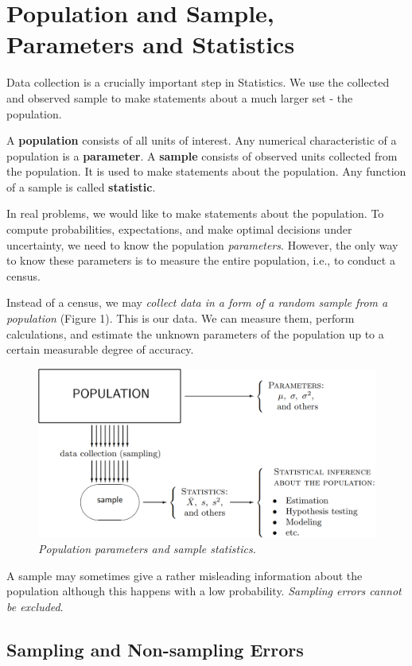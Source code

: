 \section{Population and Sample, Parameters and Statistics}

Data collection is a crucially important step in Statistics. We use the collected and observed sample to make statements about a much larger set - the population.

\begin{definition}{}
  A \textbf{population} consists of all units of interest. Any numerical characteristic of a population is a \textbf{parameter}. A \textbf{sample} consists of observed units collected from the population. It is used to make statements about the population. Any function of a sample is called \textbf{statistic}.
\end{definition}

In real problems, we would like to make statements about the population. To compute probabilities, expectations, and make optimal decisions under uncertainty, we need to know the population \textit{parameters}. However, the only way to know these parameters is to measure the entire population, i.e., to conduct a census.

Instead of a census, we may \textit{collect data in a form of a random sample from a population} (Figure 1). This is our data. We can measure them, perform calculations, and estimate the unknown parameters of the population up to a certain measurable degree of accuracy.

\begin{figure}[ht]
  \centering
  \includegraphics[width=.7\textwidth]{img/fig8-1.png}
  \caption{\textit{Population parameters and sample statistics.}}
\end{figure}

A sample may sometimes give a rather misleading information about the population although this happens with a low probability. \textit{Sampling errors cannot be excluded}.

\subsection{Sampling and Non-sampling Errors}

